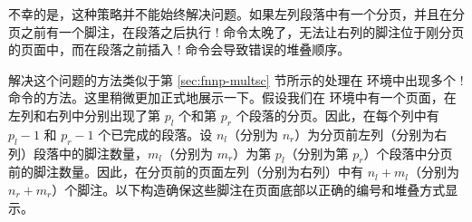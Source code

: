 % 

不幸的是，这种策略并不能始终解决问题。如果左列段落中有一个分页，并且在分页之前有一个脚注，在段落之后执行 \!\switchcolumn! 命令太晚了，无法让右列的脚注位于刚分页的页面中，而在段落之前插入 \!\switchcolumn! 命令会导致错误的堆叠顺序。


解决这个问题的方法类似于第 \ref{sec:fnnp-multsc} 节所示的处理在  环境中出现多个 \!\switchcolumn! 命令的方法。这里稍微更加正式地展示一下。假设我们在  环境中有一个页面，在左列和右列中分别出现了第 $p_l$ 个和第 $p_r$ 个段落的分页。因此，在每个列中有 $p_l-1$ 和 $p_r-1$ 个已完成的段落。设 $n_l$（分别为 $n_r$）为分页前左列（分别为右列）段落中的脚注数量，$m_l$（分别为 $m_r$）为第 $p_l$（分别为第 $p_r$）个段落中分页前的脚注数量。因此，在分页前的页面左列（分别为右列）中有 $n_l+m_l$（分别为 $n_r+m_r$）个脚注。以下构造确保这些脚注在页面底部以正确的编号和堆叠方式显示。

